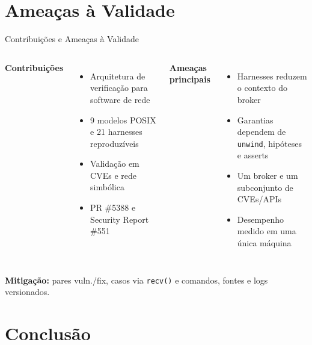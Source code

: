 \documentclass[10pt,aspectratio=169]{beamer}
\begin{document}
\section{Amea\c{c}as \`a Validade}

\begin{frame}{Contribui\c{c}\~oes e Amea\c{c}as \`a Validade}
    \begin{columns}[T]
        \textbf{Contribui\c{c}\~oes}
        \begin{itemize}\small
            \item Arquitetura de verifica\c{c}\~ao para software de rede
            \item 9 modelos POSIX e 21 harnesses reproduz\'iveis
            \item Valida\c{c}\~ao em CVEs e rede simb\'olica
            \item PR \#5388 e Security Report \#551
        \end{itemize}
        \textbf{Amea\c{c}as principais}
        \begin{itemize}\small
            \item Harnesses reduzem o contexto do broker
            \item Garantias dependem de \texttt{unwind}, hip\'oteses e asserts
            \item Um broker e um subconjunto de CVEs/APIs
            \item Desempenho medido em uma \'unica m\'aquina
        \end{itemize}
    \end{columns}
    \vspace{0.5em}
    \small \textbf{Mitiga\c{c}\~ao:} pares vuln./fix, casos via \texttt{recv()} e
    comandos, fontes e logs versionados.
\end{frame}

\section{Conclus\~ao}
\end{document}
